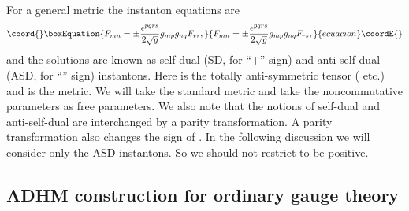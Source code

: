 \documentclass[a4paper,a4paper]{article}
\begin{document}
For a general metric \coordHE{} the instanton equations are
\begin{equation}\coord{}\boxEquation{
\label{instanton}
F_{mn}=\pm\frac{\epsilon^{pqrs}}{2\sqrt{g}}g_{mp}g_{nq}F_{rs},
}{
F_{mn}=\pm\frac{\epsilon^{pqrs}}{2\sqrt{g}}g_{mp}g_{nq}F_{rs},
}{ecuacion}\coordE{}\end{equation}
and the solutions are known as self-dual (SD, for ``+'' sign) and
anti-self-dual (ASD, for ``\myHighlight{$-$}\coordHE{}'' sign) instantons. Here
\coordHE{} is the totally anti-symmetric tensor
(\coordHE{} etc.) and \coordHE{} is the metric. We will take the
standard metric \coordHE{} and take the noncommutative
parameters \coordHE{} as free parameters. We also note that
the notions of self-dual and anti-self-dual are interchanged by a
parity transformation. A parity transformation also changes the
sign of \coordHE{}. In the following discussion we will
consider only the ASD instantons. So we should not restrict
\coordHE{} to be positive.

\subsection{ADHM construction for ordinary gauge theory}
\end{document}
